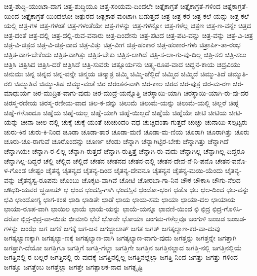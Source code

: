 {ಚಿತ್ತ-ಶುದ್ಧಿ-ಯುಂಟಾ-ದಾಗ
ಚಿತ್ತ-ಶುದ್ಧಿಯೂ
ಚಿತ್ತ-ಸಂಯಮ-ದಿಂದಲೇ
ಚಿತ್ತೈಕಾಗ್ರತೆ
ಚಿತ್ತೈಕಾಗ್ರತೆ-ಗಳಿಂದ
ಚಿತ್ತೈಕಾಗ್ರತೆ-ಯಿಂದ
ಚಿತ್ತೈಕಾಗ್ರತೆ-ಯಿಂದಲೋ
ಚಿತ್ಪುರದ
ಚಿತ್ಪ್ರಕಾಶ-ವುಂಟಾಗಿ-ಬಿಡುತ್ತದೆ
ಚಿತ್ರ
ಚಿತ್ರ-ಕರ
ಚಿತ್ರ-ಕಲೆ-ಯನ್ನು
ಚಿತ್ರ-ಕಲೆ-ಯಲ್ಲಿ
ಚಿತ್ರ-ಗಳ
ಚಿತ್ರ-ಗಳಂತೆ
ಚಿತ್ರ-ಗಳಂತೆಯೇ
ಚಿತ್ರ-ಗಳನ್ನು
ಚಿತ್ರ-ಗಳನ್ನೋ
ಚಿತ್ರ-ಗಳೆಲ್ಲ
ಚಿತ್ರಣ
ಚಿತ್ರ-ಣ-ವನ್ನೇ
ಚಿತ್ರದ
ಚಿತ್ರ-ದಂತೆ
ಚಿತ್ರ-ದಲ್ಲಿ
ಚಿತ್ರ-ದಲ್ಲಿ-ರುವ-ವನಾರು
ಚಿತ್ರ-ದಿಂದೇನು
ಚಿತ್ರ-ಪಟದ
ಚಿತ್ರ-ಪಟ-ವನ್ನು
ಚಿತ್ರ-ವನ್ನು
ಚಿತ್ರ-ವಿ-ಚಿತ್ರ
ಚಿತ್ರ-ವಿ-ಚಿತ್ರದ
ಚಿತ್ರ-ವಿ-ಚಿತ್ರ-ವಾದ
ಚಿತ್ರ-ವಿತ್ತು
ಚಿತ್ರ-ವೀಗ
ಚಿತ್ರ-ಹಂಕಾರ
ಚಿತ್ರ-ಹಂಕಾರ-ಗಳು
ಚಿತ್ರಾರ್ಪಿ-ತಾ-ರಂಭ
ಚಿತ್ರಿತ-ವಾಗ-ಬೇಕೆಂದು
ಚಿತ್ರಿತ-ವಾಗಿತ್ತು
ಚಿತ್ರಿಸ-ಬೇಕು
ಚಿತ್ರಿಸ-ಲಾಗಿದೆ
ಚಿತ್ರಿ-ಸ-ಲಾ-ಗು-ವು-ದಿಲ್ಲ
ಚಿತ್ರಿ-ಸಲಿ
ಚಿತ್ರಿ-ಸಲು
ಚಿತ್ರಿಸಿ
ಚಿತ್ರಿಸಿದ
ಚಿತ್ರಿಸಿ-ದರೆ
ಚಿತ್ರಿಸಿದೆ
ಚಿತ್ರಿ-ಸುವರು
ಚಿತ್ಸೂರ್ಯನು
ಚಿತ್ಸ್ವ-ರೂಪ-ವಾದ
ಚಿದ್ಘನ-ಕಾಯ
ಚಿದ್ರವಿಯು
ಚಿನುಮಃ
ಚಿನ್ನ
ಚಿನ್ನದ
ಚಿನ್ನ-ವನ್ನೇ
ಚಿನ್ಮಯ
ಚಿನ್ಮಾತ್ರ
ಚಿಮ್ಮಿ
ಚಿಮ್ಮಿ-ಚೆಲ್ಲಿದೆ
ಚಿಮ್ಮಿದ
ಚಿಮ್ಮಿದೆ
ಚಿಮ್ಮು-ತಿದೆ
ಚಿಮ್ಮುತಿ-ರಲಿ
ಚಿಮ್ಮುತಿವೆ
ಚಿಮ್ಮು-ತಿಹ
ಚಿಮ್ಮು-ವಂತೆ
ಚಿರ
ಚಿರಂತನ-ವಾಗಿ
ಚಿರ-ಕಾಲ
ಚಿರದ
ಚಿರ-ಪುತ್ರ
ಚಿರ-ಮ-ರಣ
ಚಿರ-ಮಾಧುರ್ಯ
ಚಿರ-ಮುದ್ರಿತ-ವಾಗು-ವುದು
ಚಿರ-ಮುದ್ರೆ-ಯನ್ನೊತ್ತಿ
ಚಿರಸ್ಥಾಯಿ-ಯಾಗಿ
ಚಿರಸ್ಥಾಯಿ-ಯಾಗಿ-ರು-ವು-ದರ
ಚಿರಸ್ಮ-ರಣೀಯ
ಚಿರಸ್ಮ-ರಣೀಯ-ವಾದ
ಚಿಲ-ಕ-ವನ್ನು
ಚಿಲುಮೆ
ಚಿಲುಮೆ-ಯನ್ನು
ಚಿಲುಮೆ-ಯಲ್ಲಿ
ಚಿಲ್ಲರೆ
ಚಿಹ್ನೆ
ಚಿಹ್ನೆ-ಗಳೊಂದೂ
ಚಿಹ್ನೆಯ
ಚಿಹ್ನೆ-ಯಲ್ಲ
ಚಿಹ್ನೆ-ಯಾಗಿ
ಚಿಹ್ನೆ-ಯಿಲ್ಲದೆ
ಚಿಹ್ನೆಯೆ
ಚಿಹ್ನೆಯೇ
ಚೀಟಿ
ಚೀಟಿಯ
ಚೀಟಿ-ಯನ್ನು
ಚೀನಾ
ಚೀಲ-ದಲ್ಲಿ
ಚುಕ್ಕೆ
ಚುಕ್ಕೆ-ಯಂತೆ
ಚುಚುಂದರಿ-ವಧ
ಚುಚ್ಚಿದಂತಾ-ಗುತ್ತದೆ
ಚುಚ್ಚು
ಚುನಾಯಿ-ಸಲ್ಪಟ್ಟರು
ಚುರು-ಕಿನ
ಚುರು-ಕಿ-ನಿಂದ
ಚೂಡಾ
ಚೂಡಾ-ತಾರ
ಚೂಡಾ-ಮಣಿ
ಚೂಡಾ-ಮ-ಣಿಯ
ಚೂರಾಗಿ
ಚೂರಾಗಿತ್ತು
ಚೂರು
ಚೂರು-ಚೂ-ರಾಗುವೆ
ಚೂರೊಂದನ್ನು
ಚೂರ್ಣ
ಚೆಂಡು
ಚೆನ್ನಾಗಿ
ಚೆನ್ನಾಗಿಟ್ಟಿರ-ಬೇಕು
ಚೆನ್ನಾಗಿತ್ತು
ಚೆನ್ನಾಗಿದೆ
ಚೆನ್ನಾಗಿಯೇ
ಚೆನ್ನಾಗಿ-ರ-ಲಿಲ್ಲ
ಚೆನ್ನಾಗಿ-ರುತ್ತದೆ
ಚೆನ್ನಾಗಿ-ರುತ್ತಿತ್ತೆ
ಚೆನ್ನಾಗಿ-ರು-ವುದು
ಚೆನ್ನಾಗಿಲ್ಲ
ಚೆನ್ನಾಗಿಲ್ಲ-ದಿದ್ದರೂ
ಚೆನ್ನಾಗಿಲ್ಲ-ದಿದ್ದರೆ
ಚೆಲ್ಲಿ
ಚೆಲ್ಲಿದ
ಚೆಲ್ಲಿದೆ
ಚೇತನ
ಚೇತನದ
ಚೇತನ-ದಲ್ಲಿ
ಚೇತನ-ದೇವ-ನೆ-ನಿ-ಪನೊ
ಚೇತನ-ವನೊ-ಳ-ಗೊಂಡ
ಚೇಷ್ಟಂ
ಚೈತನ್ಯ
ಚೈತನ್ಯದ
ಚೈತನ್ಯ-ದಿಂದ
ಚೈತನ್ಯ-ದೇವನೂ
ಚೈತನ್ಯನ
ಚೈತನ್ಯ-ಮಯಿ-ಯೆಂದು
ಚೈತನ್ಯ-ವನ್ನು
ಚೈತನ್ಯಸ್ವ-ರೂಪನು
ಚೊಂಬು
ಚೊಕ್ಕಟ-ವಾಗಿವೆ
ಚೋಟಿ
ಚೋರಬಾ-ಗಾ-ನಿನ
ಚೌಕ
ಚೌಕಾಸಿ
ಚೌಗು-ನೆಲದ
ಚೌಧರಿ-ಯವರ
ಚ್ಹಡಾಯ್
ಛ
ಛಂದ
ಛಂದಸ್ಸಿ-ಗಾಗಿ
ಛಂದಸ್ಸಿನ
ಛಂದೋ-ಭಂಗ
ಛಡೊ
ಛಲ
ಛಲ-ದಿಂದ
ಛಲ-ವನ್ನು
ಛವಿ
ಛಾಂದೋಗ್ಯ
ಛಾಗ-ಕಂಠ
ಛಾಡಿ
ಛಾಡಿತೇ
ಛಾಡೆ
ಛಾಯ
ಛಾಯ-ಸಮ
ಛಾಯಾ
ಛಾಯಾ-ದಲ
ಛಾಯಾಯ
ಛಾಯಾ-ರೂಪ-ವಾಗಿ
ಛಾಯಿಲ
ಛಾಯೆ
ಛಾಯೆ-ಯನ್ನು
ಛಾಯೆ-ಯನ್ನೂ
ಛಾವಣಿ-ಯಿಂದ
ಛಿ
ಛಿದ್ರ
ಛಿದ್ರ-ಗೊಳಿಸಿ-ದರೋ
ಛಿದ್ರ-ಛಿದ್ರ-ವಾ-ಯಿತು
ಛೀಮಾರಿ
ಛೆಲೆ
ಛೋಡೇ
ಛೋಯಾ
ಜಂಗಮ-ಗಳೆಲ್ಲವೂ
ಜಂಗುಳಿ
ಜಂಜಡ
ಜಂಜಡ-ಗಳನ್ನು
ಜಂಝೆ
ಜಗ
ಜಗಕೆ
ಜಗಕ್ಕೆ
ಜಗ-ಜನ
ಜಗಜ್ಜಾಲಾತ್
ಜಗತ
ಜಗತ್
ಜಗತ್ಕಲ್ಯಾಣ-ಕರ-ವಾ-ದುವು
ಜಗತ್ಕಲ್ಯಾಣಕ್ಕಾಗಿ
ಜಗತ್ಕಲ್ಯಾ-ಣಕ್ಕೆ
ಜಗತ್ಕಲ್ಯಾಣ-ವಾಗಿ
ಜಗತ್ಕಲ್ಯಾಣ-ವಾಗು-ವುದು
ಜಗತ್ತನ್ನು
ಜಗತ್ತನ್ನೇ
ಜಗತ್ತಾಗಿ
ಜಗತ್ತಾಗಿ-ದೆಯೋ
ಜಗತ್ತಿಗೂ
ಜಗತ್ತಿಗೆ
ಜಗತ್ತಿ-ಗೆಲ್ಲಾ
ಜಗತ್ತಿಗೇ
ಜಗತ್ತಿನ
ಜಗತ್ತಿನಲ್ಲಾದ
ಜಗತ್ತಿ-ನಲ್ಲಿ
ಜಗತ್ತಿನಲ್ಲಿಯೆ
ಜಗತ್ತಿನಲ್ಲಿ-ರ-ಬಲ್ಲರೆ
ಜಗತ್ತಿನಲ್ಲಿ-ರು-ವುದಕ್ಕೆ
ಜಗತ್ತಿನಲ್ಲಿಲ್ಲ
ಜಗತ್ತಿನಲ್ಲೆಲ್ಲಾ
ಜಗತ್ತಿ-ನಿಂದ
ಜಗತ್ತು
ಜಗತ್ತು-ಗಳಿಂದ
ಜಗತ್ತೂ
ಜಗತ್ತೆಂಬ
ಜಗತ್ತೆಲ್ಲಾ
ಜಗತ್ತೇ
ಜಗತ್ಪಾಲಕ-ನಾದ
ಜಗತ್ಸೃಷ್ಟಿ
}
